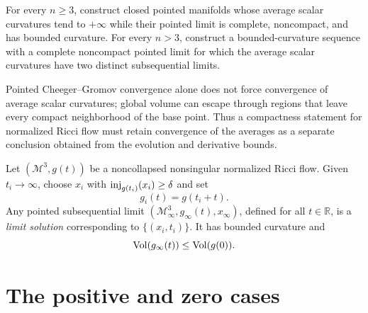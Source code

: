 \begin{example}
\label{ex:chow-iv-average-scalar-curvature-pathologies}
For every $n\ge3$, construct closed pointed manifolds whose average scalar
curvatures tend to $+\infty$ while their pointed limit is complete,
noncompact, and has bounded curvature.  For every $n>3$, construct a
bounded-curvature sequence with a complete noncompact pointed limit for
which the average scalar curvatures have two distinct subsequential limits.
\end{example}

\begin{remark}
\label{rem:chow-iv-compactness-global-averages}
Pointed Cheeger--Gromov convergence alone does not force convergence of
average scalar curvatures; global volume can escape through regions that
leave every compact neighborhood of the base point.  Thus a compactness
statement for normalized Ricci flow must retain convergence of the averages
as a separate conclusion obtained from the evolution and derivative bounds.
\end{remark}

\begin{definition}
\label{def:chow-iv-nrf-limit-solution}
Let $(\mathcal M^3,g(t))$ be a noncollapsed nonsingular normalized Ricci
flow.  Given $t_i\to\infty$, choose $x_i$ with
$\operatorname{inj}_{g(t_i)}(x_i)\ge\delta$ and set
\[
 g_i(t)=g(t_i+t).
\]
Any pointed subsequential limit
$(\mathcal M_\infty^3,g_\infty(t),x_\infty)$, defined for all
$t\in\mathbb R$, is a \emph{limit solution} corresponding to
$\{(x_i,t_i)\}$.  It has bounded curvature and
\[
 \operatorname{Vol}(g_\infty(t))\le\operatorname{Vol}(g(0)).
\]
\end{definition}

\section{The positive and zero cases}

